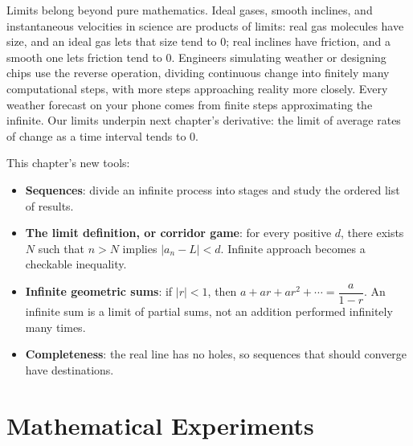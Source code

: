 \begin{lianjie}
Limits belong beyond pure mathematics. Ideal gases, smooth inclines, and instantaneous velocities in science are products of limits: real gas molecules have size, and an ideal gas lets that size tend to $0$; real inclines have friction, and a smooth one lets friction tend to $0$. Engineers simulating weather or designing chips use the reverse operation, dividing continuous change into finitely many computational steps, with more steps approaching reality more closely. Every weather forecast on your phone comes from finite steps approximating the infinite. Our limits underpin next chapter's derivative: the limit of average rates of change as a time interval tends to $0$.
\end{lianjie}

\begin{toolbox}
This chapter's new tools:
\begin{itemize}
  \item \textbf{Sequences}: divide an infinite process into stages and study the ordered list of results.
  \item \textbf{The limit definition, or corridor game}: for every positive $d$, there exists $N$ such that $n>N$ implies $|a_n-L|<d$. Infinite approach becomes a checkable inequality.
  \item \textbf{Infinite geometric sums}: if $|r|<1$, then $a+ar+ar^2+\cdots=\dfrac{a}{1-r}$. An infinite sum is a limit of partial sums, not an addition performed infinitely many times.
  \item \textbf{Completeness}: the real line has no holes, so sequences that should converge have destinations.
\end{itemize}
\end{toolbox}

\section{Mathematical Experiments}

